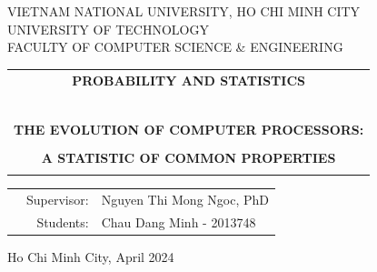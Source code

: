 \documentclass[a4paper]{report}
\begin{document}
\begin{titlepage}
  \begin{center}
    VIETNAM NATIONAL UNIVERSITY, HO CHI MINH CITY\\
    UNIVERSITY OF TECHNOLOGY \\
    FACULTY OF COMPUTER SCIENCE \& ENGINEERING
  \end{center}

  \vspace{1cm}


  \vspace{1cm}


  \begin{center}
    \begin{tabular}{c}
      \textbf{{\Large PROBABILITY AND STATISTICS}}          \\
      ~~                                                    \\
      \hline
      \\
      \textbf{\large THE EVOLUTION OF COMPUTER PROCESSORS:} \\
      \\
      \textbf{\large A STATISTIC OF COMMON PROPERTIES}      \\
      \\
      \hline
    \end{tabular}
  \end{center}

  \vspace{1.5cm}

  \begin{table}[h]
    \begin{tabular}{rrl}
      \hspace{5 cm} & Supervisor: & Nguyen Thi Mong Ngoc, PhD \\

                    & Students:   & Chau Dang Minh - 2013748
    \end{tabular}
  \end{table}
  \vspace{1.5cm}
  \begin{center}
    {\footnotesize Ho Chi Minh City, April 2024}
  \end{center}
\end{titlepage}
\end{document}
